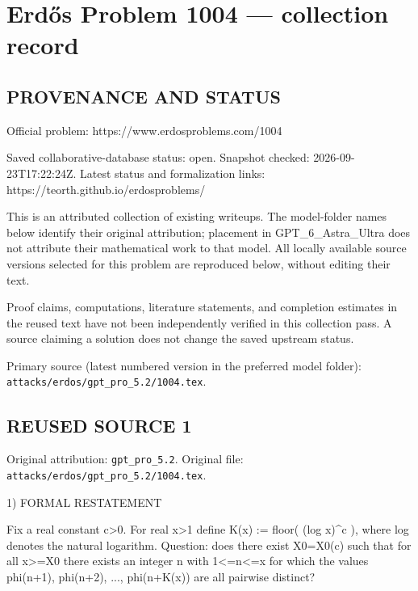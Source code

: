 \section*{Erd\H{o}s Problem 1004 --- collection record}

\subsection*{PROVENANCE AND STATUS}
Official problem: https://www.erdosproblems.com/1004

Saved collaborative-database status: open.
Snapshot checked: 2026-09-23T17:22:24Z.
Latest status and formalization links: https://teorth.github.io/erdosproblems/

This is an attributed collection of existing writeups. The model-folder names below identify their original attribution; placement in GPT\_6\_Astra\_Ultra does not attribute their mathematical work to that model. All locally available source versions selected for this problem are reproduced below, without editing their text.

Proof claims, computations, literature statements, and completion estimates in the reused text have not been independently verified in this collection pass. A source claiming a solution does not change the saved upstream status.

Primary source (latest numbered version in the preferred model folder): \texttt{attacks/erdos/gpt\_pro\_5.2/1004.tex}.

\subsection*{REUSED SOURCE 1}
Original attribution: \texttt{gpt\_pro\_5.2}.
Original file: \texttt{attacks/erdos/gpt\_pro\_5.2/1004.tex}.


1) FORMAL RESTATEMENT

Fix a real constant c>0. For real x>1 define
  K(x) := floor( (log x)^c ),
where log denotes the natural logarithm.
Question: does there exist X0=X0(c) such that for all x>=X0 there exists an integer n with 1<=n<=x for which the values
  phi(n+1), phi(n+2), ..., phi(n+K(x))
are all pairwise distinct?

